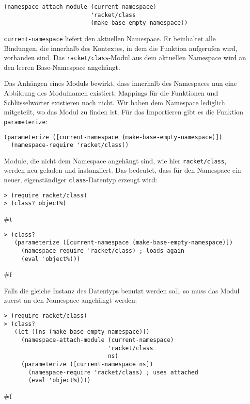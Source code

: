 \begin{lstlisting}
(namespace-attach-module (current-namespace)
                         'racket/class
                         (make-base-empty-namespace))
\end{lstlisting}

\texttt{current-namespace} liefert den aktuellen Namespace. Er beinhaltet alle Bindungen, die innerhalb des Kontextes, in dem die Funktion aufgerufen wird, vorhanden sind. Das \texttt{racket/class}-Modul aus dem aktuellen Namespace wird an den leeren Base-Namespace angehängt.

Das Anhängen eines Moduls bewirkt, dass innerhalb des Namespaces nun eine Abbildung des Modulnamen existiert; Mappings für die Funktionen und Schlüsselwörter existieren noch nicht. Wir haben dem Namespace lediglich mitgeteilt, wo das Modul zu finden ist. Für das Importieren gibt es die Funktion \texttt{parameterize}:

\begin{lstlisting}
(parameterize ([current-namespace (make-base-empty-namespace)])
  (namespace-require 'racket/class))
\end{lstlisting}

Module, die nicht dem Namespace angehängt sind, wie hier \texttt{racket/class}, werden neu geladen und instanziiert. Das bedeutet, dass für den Namespace ein neuer, eigenständiger \texttt{class}-Datentyp erzeugt wird:

\begin{lstlisting}
> (require racket/class)
> (class? object%)
\end{lstlisting}
{\routput \#t}

\begin{lstlisting}
> (class?
   (parameterize ([current-namespace (make-base-empty-namespace)])
     (namespace-require 'racket/class) ; loads again
     (eval 'object%)))
\end{lstlisting}
{\routput \#f}

Falls die gleiche Instanz des Datentyps benutzt werden soll, so muss das Modul zuerst an den Namespace angehängt werden:

\begin{lstlisting}
> (require racket/class)
> (class?
   (let ([ns (make-base-empty-namespace)])
     (namespace-attach-module (current-namespace)
                              'racket/class
                              ns)
     (parameterize ([current-namespace ns])
       (namespace-require 'racket/class) ; uses attached
       (eval 'object%))))
\end{lstlisting}
{\routput \#f}

